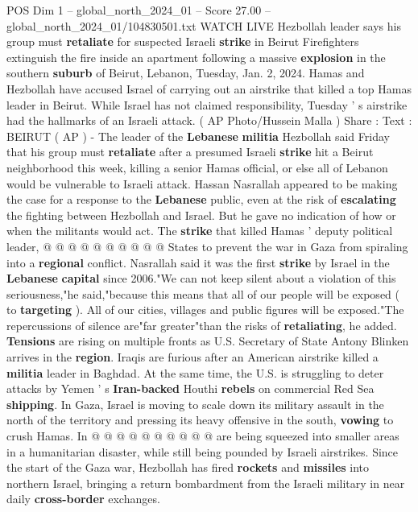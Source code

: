 \begin{textsample}{POS Dim 1 – global\_north\_2024\_01 – Score 27.00 – global\_north\_2024\_01/104830501.txt}  \label{ex:f1_pos_126}
WATCH LIVE Hezbollah leader says his group must \textbf{retaliate} for suspected Israeli \textbf{strike} in Beirut Firefighters extinguish the fire inside an apartment following a massive \textbf{explosion} in the southern \textbf{suburb} of Beirut, Lebanon, Tuesday, Jan. 2, 2024.
Hamas and Hezbollah have accused Israel of carrying out an airstrike that killed a top Hamas leader in Beirut.
While Israel has not claimed responsibility, Tuesday ' s airstrike had the hallmarks of an Israeli attack. ( AP Photo/Hussein Malla ) Share : Text : BEIRUT ( AP ) - The leader of the \textbf{Lebanese} \textbf{militia} Hezbollah said Friday that his group must \textbf{retaliate} after a presumed Israeli \textbf{strike} hit a Beirut neighborhood this week, killing a senior Hamas official, or else all of Lebanon would be vulnerable to Israeli attack.
Hassan Nasrallah appeared to be making the case for a response to the \textbf{Lebanese} public, even at the risk of \textbf{escalating} the fighting between Hezbollah and Israel.
But he gave no indication of how or when the militants would act.
The \textbf{strike} that killed Hamas ' deputy political leader, @ @ @ @ @ @ @ @ @ @ States to prevent the war in Gaza from spiraling into a \textbf{regional} conflict.
Nasrallah said it was the first \textbf{strike} by Israel in the \textbf{Lebanese} \textbf{capital} since 2006."We can not keep silent about a violation of this seriousness,"he said,"because this means that all of our people will be exposed ( to \textbf{targeting} ).
All of our cities, villages and public figures will be exposed."The repercussions of silence are"far greater"than the risks of \textbf{retaliating}, he added. \textbf{Tensions} are rising on multiple fronts as U.S.
Secretary of State Antony Blinken arrives in the \textbf{region}.
Iraqis are furious after an American airstrike killed a \textbf{militia} leader in Baghdad.
At the same time, the U.S. is struggling to deter attacks by Yemen ' s \textbf{Iran-backed} Houthi \textbf{rebels} on commercial Red Sea \textbf{shipping}.
In Gaza, Israel is moving to scale down its military assault in the north of the territory and pressing its heavy offensive in the south, \textbf{vowing} to crush Hamas.
In @ @ @ @ @ @ @ @ @ @ are being squeezed into smaller areas in a humanitarian disaster, while still being pounded by Israeli airstrikes.
Since the start of the Gaza war, Hezbollah has fired \textbf{rockets} and \textbf{missiles} into northern Israel, bringing a return bombardment from the Israeli military in near daily \textbf{cross-border} exchanges.

\end{textsample}
